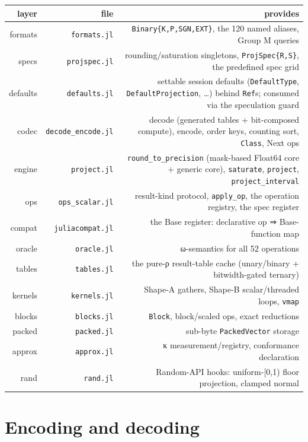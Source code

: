 \begin{table}[h]
\centering
\begin{tabulary}{\linewidth}{R R R}
\toprule
layer & file & provides \\
\toprule
formats & \texttt{formats.jl} & \texttt{Binary\{K,P,SGN,EXT\}}, the 120 named aliases, Group M queries \\
specs & \texttt{projspec.jl} & rounding/saturation singletons, \texttt{ProjSpec\{R,S\}}, the predefined spec grid \\
defaults & \texttt{defaults.jl} & settable session defaults (\texttt{DefaultType}, \texttt{DefaultProjection}, …) behind \texttt{Ref}s; consumed via the speculation guard \\
codec & \texttt{decode\_encode.jl} & decode (generated tables + bit-composed compute), encode, order keys, counting sort, \texttt{Class}, Next ops \\
engine & \texttt{project.jl} & \texttt{round\_to\_precision} (mask-based Float64 core + generic core), \texttt{saturate}, \texttt{project}, \texttt{project\_interval} \\
ops & \texttt{ops\_scalar.jl} & result-kind protocol, \texttt{apply\_op}, the operation registry, the spec register \\
compat & \texttt{juliacompat.jl} & the Base register: declarative op ⇒ Base-function map \\
oracle & \texttt{oracle.jl} & ω-semantics for all 52 operations \\
tables & \texttt{tables.jl} & the pure-ρ result-table cache (unary/binary + bitwidth-gated ternary) \\
kernels & \texttt{kernels.jl} & Shape-A gathers, Shape-B scalar/threaded loops, \texttt{vmap} \\
blocks & \texttt{blocks.jl} & \texttt{Block}, block/scaled ops, exact reductions \\
packed & \texttt{packed.jl} & sub-byte \texttt{PackedVector} storage \\
approx & \texttt{approx.jl} & κ measurement/registry, conformance declaration \\
rand & \texttt{rand.jl} & Random-API hooks: uniform-[0,1) floor projection, clamped normal \\
\bottomrule
\end{tabulary}

\end{table}



\section{Encoding and decoding}



